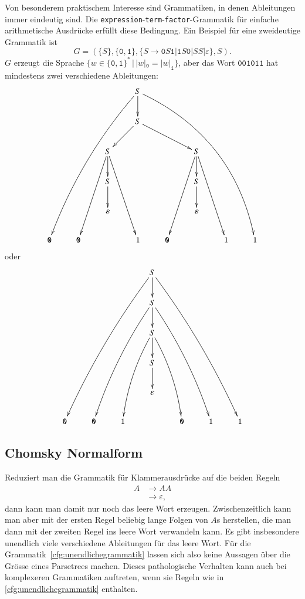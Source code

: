 Von besonderem praktischem Interesse sind Grammatiken, in denen
Ableitungen immer eindeutig sind. Die
%
{\tt expression}-{\tt term}-{\tt factor}-Grammatik für einfache
arithmetische Ausdrücke erfüllt diese Bedingung. 
Ein Beispiel für eine zweideutige Grammatik ist
\[
G=(\{S\}, \{\texttt{0},\texttt{1}\}, \{S\to \texttt{0}S\texttt{1}|\texttt{1}S\texttt{0}|SS|\varepsilon\}, S).
\]
$G$ erzeugt die Sprache
$\{w\in \{\texttt{0},\texttt{1}\}^*\,|\, |w|_{\texttt{0}} = |w|_\texttt{1}\}$, aber das Wort
$\texttt{001011}$ hat mindestens zwei verschiedene Ableitungen:
\[
\xymatrix{
&&&S\ar@/_10pt/[dddddlll]\ar[d]\ar@/^30pt/[dddddrrrr]
\\
&&&S\ar[dl]\ar[drr]
\\
 &&S\ar[dddl]\ar[d]\ar[dddr]&&&S\ar[dddl]\ar[d]\ar[dddr]&&
\\
&&S\ar[d]&&&S\ar[d]&&
\\
 & &\varepsilon& & &\varepsilon& & 
\\
\texttt{0}&\texttt{0}& &\texttt{1}&\texttt{0}& &\texttt{1}&\texttt{1}
}
\]
oder
\[
\xymatrix{
&&&S\ar@/_/[dddddlll]\ar[d]\ar@/^/[dddddrrr]
\\
&&&S\ar@/_/[ddddll]\ar[d]\ar@/^/[ddddrr]&&&
\\
&&&S\ar@/_/[dddl]\ar[d]\ar@/^/[dddr]&&&
\\
&&&S\ar[d]&&&
\\
&&&\varepsilon&&&
\\
\texttt{0}&\texttt{0}&\texttt{1}&&\texttt{0}&\texttt{1}&\texttt{1}
}
\]


\subsection{Chomsky Normalform}
Reduziert man die Grammatik für Klammerausdrücke auf die beiden Regeln
\begin{equation}
\begin{aligned}
A&\to AA
\\
 &\to\varepsilon,
\end{aligned}
\label{cfg:unendlichegrammatik}
\end{equation}
dann kann man damit nur noch das leere Wort erzeugen.
Zwischenzeitlich kann man aber mit der ersten Regel beliebig lange 
Folgen von $A$s herstellen, die man dann mit der zweiten Regel ins
leere Wort verwandeln kann.
Es gibt insbesondere unendlich viele verschiedene Ableitungen für
das leere Wort.
Für die Grammatik~\eqref{cfg:unendlichegrammatik} lassen sich also
keine Aussagen über die Grösse eines Parsetrees machen.
Dieses pathologische Verhalten kann auch bei komplexeren Grammatiken
auftreten, wenn sie Regeln wie in \eqref{cfg:unendlichegrammatik}
enthalten.

